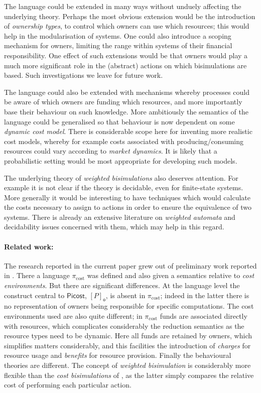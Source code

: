 \documentclass{LMCS}
\newcommand{\pfn}[1]{\mathsf{#1}}  \newcommand{\cfn}[1]{\mathsf{#1}}  \newcommand{\ownfnt}[1]{{\mathsf{#1}}}
\newcommand{\picost}{\ensuremath{\pfn{Picost}}\xspace}
\newcommand{\Cloc}[2]{[#1]_{\ownfnt{#2}}}
\begin{document}
The language could be extended in many ways without unduely affecting
the underlying theory.  Perhaps the most obvious extension would be
the introduction of \emph{ownership types}, to control which owners
can use which resources; this would help in the modularisation of
systems. One could also introduce a scoping mechanism for owners,
limiting the range within systems of their financial responsibility. 
One effect of such  extensions would be that owners would play
a much more significant role in the (abstract) actions on which
bisimulations are based. Such investigations we leave for future work. 

The language could also be extended with mechanisms whereby processes
could be aware of which owners are funding which resources, and more
importantly base their behaviour on such knowledge. More ambitiously
the semantics of the language could be generalised so that behaviour is 
now dependent on some  \emph{dynamic cost model}. There is considerable 
scope here for inventing more realistic cost models, whereby for example 
costs associated with producing/consuming resources could vary according to
\emph{market dynamics}. It is likely that a probabilistic setting would be
most appropriate for developing such models. 










The underlying theory of \emph{weighted bisimulations} also deserves
attention. For example it is not clear if the theory is decidable,
even for finite-state systems. More generally it would be interesting
to have techniques which would calculate the costs necessary to assign
to actions in order to ensure the equivalence of two systems.
There is already an extensive literature on \emph{weighted automata} \cite{wa}
and  decidability issues concerned with them, which may help in this regard.

\paragraph{Related work:} The research reported in the current paper
grew out of preliminary work reported in \cite{picost}. There a
language $\pi_{\text{cost}}$ was defined and also given a semantics
relative to \emph{cost environments}. But there are significant
differences.  At the language level the construct central to \picost,
$\Cloc{P}{o}$, is absent in $\pi_{\text{cost}}$; indeed in the latter
there is no representation of owners being responsible for specific
computations.  The cost environments used are also quite different; in
$\pi_{\text{cost}}$ funds are associated directly with resources,
which complicates considerably the reduction semantics as the resource
types need to be dynamic.  Here all funds are retained by owners,
which simplifies matters considerably, and this facilities the
introduction of \emph{charges} for resource usage and \emph{benefits}
for resource provision. Finally the behavioural theories are
different.  The concept of \emph{weighted bisimulation} is considerably
more flexible than the \emph{cost bisimulations} of \cite{picost}, as
the latter simply compares the relative cost of performing each
particular action.
\end{document}
